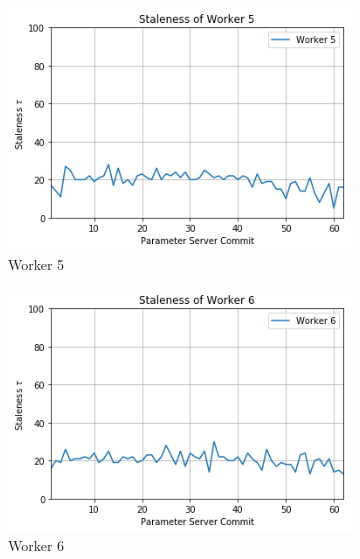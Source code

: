 \begin{figure}
\begin{subfigure}{.24\textwidth}
    \includegraphics[width=\linewidth]{resources/images/plots/adag_agn_mnist/epoch_40/15/001/staleness/worker_5}
    \caption{Worker 5}
  \end{subfigure}
  \begin{subfigure}{.24\textwidth}
    \centering
    \includegraphics[width=\linewidth]{resources/images/plots/adag_agn_mnist/epoch_40/15/001/staleness/worker_6}
    \caption{Worker 6}
  \end{subfigure}
  \begin{subfigure}{.24\textwidth}
    \centering

\end{subfigure}
\end{figure}
